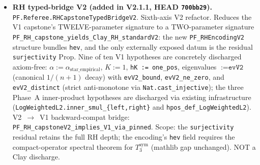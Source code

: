 \begin{itemize}
\item \textbf{RH typed-bridge V2 (added in V2.1.1, HEAD \texttt{700bb29}).}
\texttt{PF.\allowbreak{}Referee.\allowbreak{}RHCapstone\allowbreak{}Typed\allowbreak{}Bridge\allowbreak{}V2}. Sixth-axis V2 refactor.
Reduces the V1 capstone's TWELVE-parameter signature to a
TWO-parameter signature
\texttt{PF\_\allowbreak{}RH\_\allowbreak{}capstone\_\allowbreak{}yields\_\allowbreak{}Clay\_\allowbreak{}RH\_\allowbreak{}standardV2}: the new
\texttt{PF\_RHEncodingV2} structure bundles \texttt{hev}, and the
only externally exposed datum is the residual \texttt{surjectivity}
Prop. Nine of ten V1 hypotheses are concretely discharged
axiom-free: $\alpha := \alpha_{\mathrm{star\_empirical}}$,
$K := 1$, \texttt{hK := one\_pos}, eigenvalues $:= \texttt{evV2}$
(canonical $1/(n{+}1)$ decay) with
\texttt{evV2\_bound}, \texttt{evV2\_ne\_zero}, and
\texttt{evV2\_distinct} (strict anti-monotone via
\texttt{Nat.cast\_injective}); the three Phase~A inner-product
hypotheses are discharged via existing infrastructure
(\texttt{LogWeightedL2.\allowbreak{}inner\_\allowbreak{}smul\_\allowbreak{}\{left,right\}} and
\texttt{hpos\_def\_LogWeightedL2}). V2~$\to$~V1 backward-compat
bridge: \texttt{PF\_\allowbreak{}RH\_\allowbreak{}capstoneV2\_\allowbreak{}implies\_\allowbreak{}V1\_\allowbreak{}via\_\allowbreak{}pinned}.
Scope: the \texttt{surjectivity} residual retains the full
RH depth; the encoding's \texttt{hev} field requires the
compact-operator spectral theorem for $T_3^{\mathrm{sym}}$
(mathlib gap unchanged). NOT a Clay discharge.


\end{itemize}
